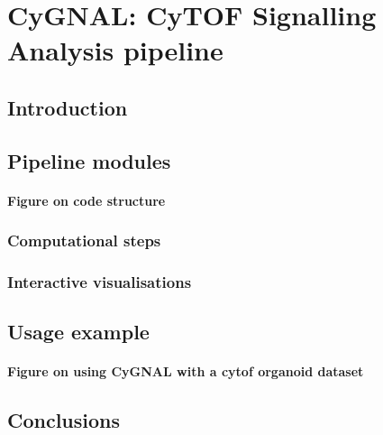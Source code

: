 \chapter{CyGNAL: CyTOF Signalling Analysis pipeline}
\label{03cygnal}

\section{Introduction}

\section{Pipeline modules}

\subsubsection{Figure on code structure}

\subsection{Computational steps}

\subsection{Interactive visualisations}

\section{Usage example}

\subsubsection{Figure on using CyGNAL with a cytof organoid dataset}

\section{Conclusions}
